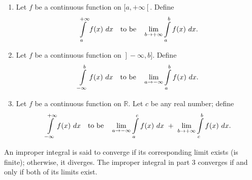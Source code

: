 \begin{definition}\label{def:imp_int1}
\begin{enumerate}
\item		Let $f$ be a continuous function on $[a,+\infty\left[\right.$. Define  %
$$\ds \int\limits_a^{+\infty} f(x)\ dx \quad \text{to be}\quad \lim_{b\to+\infty}\ds \int\limits_a^b f(x)\ dx.$$

\item		Let $f$ be a continuous function on $\left.\right]-\infty,b]$. Define %
$$\ds \int\limits_{-\infty}^b f(x)\ dx \quad \text{to be}\quad \lim_{a\to-\infty}\ds \int\limits_a^b f(x)\ dx.$$

\item		Let $f$ be a continuous function on $\mathbb{R}$. Let $c$ be any real number; define %
$$\displaystyle \int\limits_{-\infty}^{+\infty} f(x)\ dx \quad \text{to be}\quad \lim_{a\to-\infty}\displaystyle \int\limits_a^c f(x)\ dx\ +\ \lim_{b\to+\infty}\displaystyle \int\limits_c^b f(x)\ dx.$$
\end{enumerate}
An improper integral is said to converge if its corresponding limit exists (is finite); otherwise, it diverges. The improper integral in part 3 converges if and only if both of its limits exist.
\end{definition}

